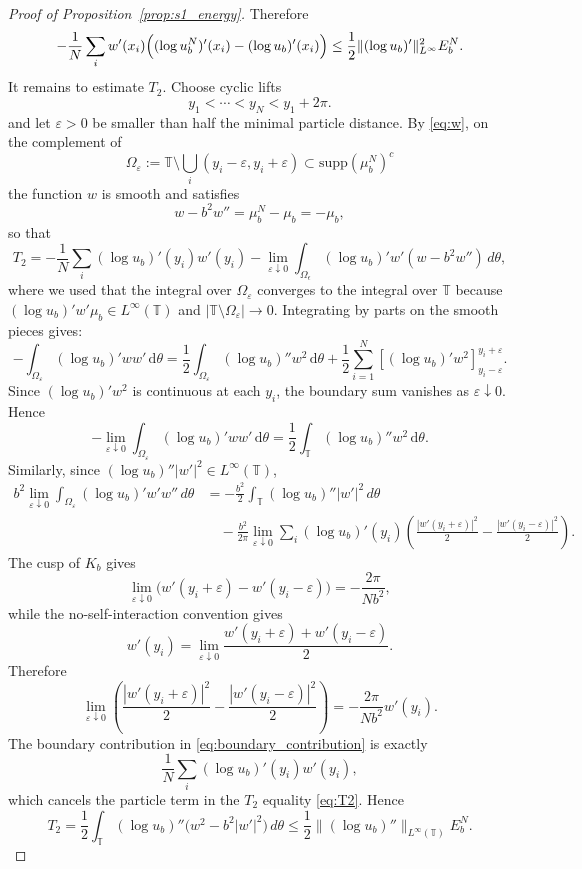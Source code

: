\documentclass[11pt]{article}
\theoremstyle{definition}
\newcommand{\Torus}{\mathbb{T}}
\begin{document}
\begin{proof}[Proof of Proposition~\ref{prop:s1_energy}]
Therefore
\begin{equation}\label{eq:me-t1}
-\frac1N\sum_i
w'(x_i)\Bigl((\log u^N_b)'(x_i)-(\log u_b)'(x_i)\Bigr)
\le
\frac12\|(\log u_b)'\|_{L^\infty}^2E^N_b .
\end{equation}
It remains to estimate \(T_2\). Choose cyclic lifts
\[
y_1<\cdots<y_N<y_1+2\pi .
\]
and let \(\varepsilon>0\) be smaller than half the minimal particle distance.
By \eqref{eq:w}, on the complement of
\[
\Omega_\varepsilon := \mathbb T \setminus \bigcup_i (y_i-\varepsilon,y_i+\varepsilon)
\subset \text{supp}(\mu_b^N)^c\]
the function \(w\) is smooth and satisfies
\[
w-b^2w''=\mu_b^N-\mu_b= -\mu_b ,
\]
so that
\begin{equation}
    \label{eq:T2}
T_2
=
-\frac1N\sum_i(\log u_b)'(y_i)w'(y_i)
-\lim_{\varepsilon\downarrow0}
\int_{\Omega_\epsilon}
(\log u_b)'w'(w-b^2w'')\,d\theta,
\end{equation}
where we used that  the integral over $\Omega_\varepsilon$ converges to the integral over $\Torus$ because $(\log u_b)'w'\mu_b\in L^\infty(\Torus)$ and $|\Torus\setminus\Omega_\varepsilon|\to0$.
Integrating by parts on the smooth pieces gives: 
\[
-\int_{\Omega_\varepsilon}(\log u_b)'ww'\,\mathrm d\theta
=
\frac12\int_{\Omega_\varepsilon}(\log u_b)''w^2\,\mathrm d\theta 
+\frac12\sum_{i=1}^N
\left[(\log u_b)'w^2\right]_{y_i-\varepsilon}^{y_i+\varepsilon}.
\]
Since $(\log u_b)'w^2$ is continuous at each $y_i$, the boundary sum
vanishes as $\varepsilon\downarrow0$. Hence
\[
-\lim_{\varepsilon\downarrow0}
\int_{\Omega_\varepsilon}(\log u_b)'ww'\,\mathrm d\theta
=
\frac12\int_{\Torus}(\log u_b)''w^2\,\mathrm d\theta.
\]
Similarly, since $(\log u_b)''|w'|^2\in L^\infty(\Torus)$,
\begin{equation}
    \label{eq:boundary_contribution}
\begin{aligned}
b^2\lim_{\varepsilon\downarrow0}\int_{\Omega_\varepsilon}
(\log u_b)'w'w''\,d\theta
&=
-\frac{b^2}{2}\int_{\Torus}(\log u_b)''|w'|^2\,d\theta
\\
&\quad
-\frac{b^2}{2\pi}\lim_{\varepsilon\downarrow0}
\sum_i(\log u_b)'(y_i)
\left(
\frac{|w'(y_i+\varepsilon)|^2}{2}
-
\frac{|w'(y_i-\varepsilon)|^2}{2}
\right).
\end{aligned}
\end{equation}
The cusp of \(K_b\) gives
\[
\lim_{\varepsilon\downarrow0}
\bigl(w'(y_i+\varepsilon)-w'(y_i-\varepsilon)\bigr)
=
-\frac{2\pi}{Nb^2},
\]
while the no-self-interaction convention gives
\[
w'(y_i)
=
\lim_{\varepsilon\downarrow0}
\frac{w'(y_i+\varepsilon)+w'(y_i-\varepsilon)}2 .
\]
Therefore
\[
\lim_{\varepsilon\downarrow0}
\left(
\frac{|w'(y_i+\varepsilon)|^2}{2}
-
\frac{|w'(y_i-\varepsilon)|^2}{2}
\right)
=
-\frac{2\pi}{Nb^2}w'(y_i).
\]
The boundary contribution in \eqref{eq:boundary_contribution} is exactly
\[
\frac1N\sum_i(\log u_b)'(y_i)w'(y_i),
\]
which cancels the particle term in the \(T_2\) equality \eqref{eq:T2}. Hence
\begin{equation} \label{eq:me-t2}
T_2
=
\frac12\int_{\Torus}(\log u_b)''
\bigl(w^2-b^2|w'|^2\bigr)\,d\theta \le
\frac12\|(\log u_b)''\|_{L^\infty(\Torus)}E^N_b .
\end{equation}


\end{proof}
\end{document}
